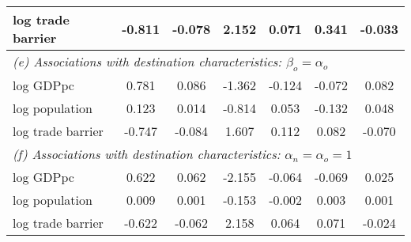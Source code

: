 \begin{table}[h!]
\begin{center}
\begin{tabular}{lcccccc}
log trade barrier& -0.811& -0.078& 2.152& 0.071& 0.341& -0.033\\
\midrule\multicolumn{7}{l}{\textit{(e) Associations with destination characteristics: $\beta_o = \alpha_o$}}\\[4pt]
log GDPpc& 0.781& 0.086& -1.362& -0.124& -0.072& 0.082\\
log population& 0.123& 0.014& -0.814& 0.053& -0.132& 0.048\\
log trade barrier& -0.747& -0.084& 1.607& 0.112& 0.082& -0.070\\
\midrule\multicolumn{7}{l}{\textit{(f) Associations with destination characteristics: $\alpha_n=\alpha_o=1$}}\\[4pt]
log GDPpc& 0.622& 0.062& -2.155& -0.064& -0.069& 0.025\\
log population& 0.009& 0.001& -0.153& -0.002& 0.003& 0.001\\
log trade barrier& -0.622& -0.062& 2.158& 0.064& 0.071& -0.024\\
\bottomrule
\end{tabular}
\end{center}
\normalsize
\end{table}
